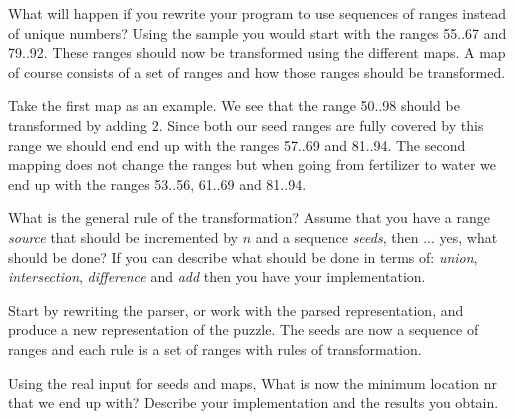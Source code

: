 \documentclass[a4paper,11pt]{article}
\begin{document}
What will happen if you rewrite your program to use sequences of
ranges instead of unique numbers? Using the sample you would start
with the ranges 55..67 and 79..92. These ranges should now be
transformed using the different maps. A map of course consists of a set of
ranges and how those ranges should be transformed.

Take the first map as an example. We see that the range 50..98 should
be transformed by adding 2. Since both our seed ranges are fully
covered by this range we should end end up with the ranges 57..69 and
81..94. The second mapping does not change the ranges but when going from
fertilizer to water we end up with the ranges 53..56, 61..69 and 81..94.

What is the general rule of the transformation? Assume that you have a
range {\em source} that should be incremented by $n$ and a sequence
{\em seeds}, then ... yes, what should be done? If you can describe
what should be done in terms of: {\em union}, {\em intersection}, {\em
  difference} and {\em add} then you have your implementation.

Start by rewriting the parser, or work with the parsed representation,
and produce a new representation of the puzzle. The seeds are now a
sequence of ranges and each rule is a set of ranges with rules of
transformation.

Using the real input for seeds and maps, What is now the minimum
location nr that we end up with? Describe your implementation and the
results you obtain.
\end{document}
